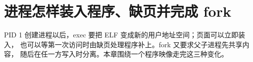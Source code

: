\chapter{进程怎样装入程序、缺页并完成 fork}

PID 1 创建进程以后，exec 要把 ELF 变成新的用户地址空间；页面可以立即装入，
也可以等第一次访问时由缺页处理程序补上。fork 又要求父子进程先共享内容，
随后在任一方写入时分离。本章围绕一个程序映像走完这三种变化。









